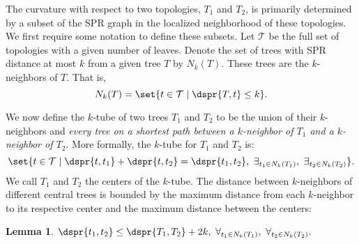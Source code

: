 \documentclass{amsart}
\newtheorem{lemma}[theorem]{Lemma}
\newcommand{\TT}{\mathcal T}
\begin{document}
The curvature with respect to two topologies, $T_1$ and $T_2$, is primarily determined by a subset of the SPR graph in the localized neighborhood of these topologies.
We first require some notation to define these subsets.
Let $\TT$ be the full set of topologies with a given number of leaves.
Denote the set of trees with SPR distance at most $k$ from a given tree $T$ by $N_k(T)$.
These trees are the $k$-neighbors of $T$.
That is, $$ N_k(T) = \set{t \in \TT \mid \dspr{T, t} \le k} .$$

We now define the $k$-tube of two trees $T_1$ and $T_2$ to be the union of their $k$-neighbors and \emph{every tree on a shortest path between a $k$-neighbor of $T_1$ and a $k$-neighbor of $T_2$}.
More formally, the $k$-tube for $T_1$ and $T_2$ is:
\[ \set{t \in \TT \mid \dspr{t, t_1} + \dspr{t, t_2} = \dspr{t_1, t_2},\ \exists_{t_1 \in N_k(T_1)},\ \exists_{t_2 \in N_k(T_2)} } .\]
We call $T_1$ and $T_2$ the centers of the $k$-tube.
The distance between $k$-neighbors of different central trees is bounded by the maximum distance from each $k$-neighbor to its respective center and the maximum distance between the centers:

\begin{lemma}
	\label{lem:neighbor_distance}
	$\dspr{t_1, t_2} \le \dspr{T_1, T_2} + 2k,\ \forall_{t_1 \in N_k(T_1)},\ \forall_{t_2 \in N_k(T_2)}.$
\end{lemma}
\end{document}
